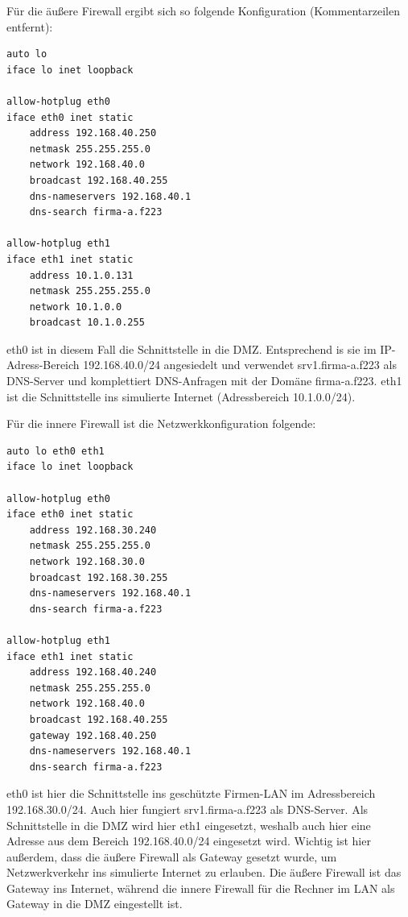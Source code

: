 Für die äußere Firewall ergibt sich so folgende Konfiguration (Kommentarzeilen entfernt):
\begin{lstlisting}
auto lo
iface lo inet loopback

allow-hotplug eth0
iface eth0 inet static
	address 192.168.40.250
	netmask 255.255.255.0
	network 192.168.40.0
	broadcast 192.168.40.255
	dns-nameservers 192.168.40.1
	dns-search firma-a.f223

allow-hotplug eth1
iface eth1 inet static
	address 10.1.0.131
	netmask 255.255.255.0
	network 10.1.0.0
	broadcast 10.1.0.255
\end{lstlisting}
eth0 ist in diesem Fall die Schnittstelle in die DMZ. Entsprechend is sie im IP-Adress-Bereich 192.168.40.0/24 angesiedelt und verwendet srv1.firma-a.f223 als DNS-Server und komplettiert DNS-Anfragen mit der Domäne firma-a.f223. eth1 ist die Schnittstelle ins simulierte Internet (Adressbereich 10.1.0.0/24).

Für die innere Firewall ist die Netzwerkkonfiguration folgende:
\begin{lstlisting}
auto lo eth0 eth1
iface lo inet loopback

allow-hotplug eth0
iface eth0 inet static
	address 192.168.30.240
	netmask 255.255.255.0
	network 192.168.30.0
	broadcast 192.168.30.255
	dns-nameservers 192.168.40.1
	dns-search firma-a.f223

allow-hotplug eth1
iface eth1 inet static
	address 192.168.40.240
	netmask 255.255.255.0
	network 192.168.40.0
	broadcast 192.168.40.255
	gateway 192.168.40.250
	dns-nameservers 192.168.40.1
	dns-search firma-a.f223
\end{lstlisting}

eth0 ist hier die Schnittstelle ins geschützte Firmen-LAN im Adressbereich 192.168.30.0/24. Auch hier fungiert srv1.firma-a.f223 als DNS-Server. Als Schnittstelle in die DMZ wird hier eth1 eingesetzt, weshalb auch hier eine Adresse aus dem Bereich 192.168.40.0/24 eingesetzt wird. Wichtig ist hier außerdem, dass die äußere Firewall als Gateway gesetzt wurde, um Netzwerkverkehr ins simulierte Internet zu erlauben. Die äußere Firewall ist das Gateway ins Internet, während die innere Firewall für die Rechner im LAN als Gateway in die DMZ eingestellt ist.